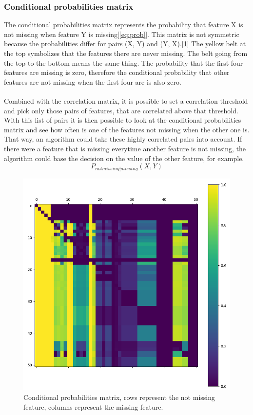 \documentclass[11pt]{article}
\begin{document}
      \subsubsection{Conditional probabilities matrix}
        The conditional probabilities matrix represents the probability that feature X is not missing when feature Y is missing[\ref{eq:prob}]. This matrix is not symmetric because the probabilities differ for pairs (X, Y) and (Y, X).[\ref{figure:cond_prob_matrix}] The yellow belt at the top symbolizes that the features there are never missing. The belt going from the top to the bottom means the same thing. The probability that the first four features are missing is zero, therefore the conditional probability that other features are not missing when the first four are is also zero.
        \\~\\
        Combined with the correlation matrix, it is possible to set a correlation threshold and pick only those pairs of features, that are correlated above that threshold. With this list of pairs it is then possible to look at the conditional probabilities matrix and see how often is one of the features not missing when the other one is. That way, an algorithm could take these highly correlated pairs into account. If there were a feature that is missing everytime another feature is not missing, the algorithm could base the decision on the value of the other feature, for example.
        \begin{equation}
          \label{eq:prob}
          P_{not missing | missing}(X, Y)
        \end{equation}
        \begin{figure}
          \centering
          \caption{Conditional probabilities matrix, rows represent the not missing feature, columns represent the missing feature.}
          \label{figure:cond_prob_matrix}
          \includegraphics[scale=0.6]{thesis_res/cond/heatmap_cropped.png}
        \end{figure}
  \newpage
\end{document}
